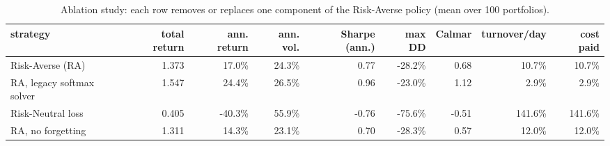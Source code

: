 \begin{table}[ht!]
\centering
\footnotesize
\setlength{\tabcolsep}{4pt}
\begin{tabular}{lrrrrrrrr}
\hline
strategy & total return & ann. return & ann. vol. & Sharpe (ann.) & max DD & Calmar & turnover/day & cost paid \\
\hline
Risk-Averse (RA) & 1.373 & 17.0\% & 24.3\% & 0.77 & -28.2\% & 0.68 & 10.7\% & 10.7\% \\
RA, legacy softmax solver & 1.547 & 24.4\% & 26.5\% & 0.96 & -23.0\% & 1.12 & 2.9\% & 2.9\% \\
Risk-Neutral loss & 0.405 & -40.3\% & 55.9\% & -0.76 & -75.6\% & -0.51 & 141.6\% & 141.6\% \\
RA, no forgetting & 1.311 & 14.3\% & 23.1\% & 0.70 & -28.3\% & 0.57 & 12.0\% & 12.0\% \\
\hline
\end{tabular}
\caption{Ablation study: each row removes or replaces one component of the Risk-Averse policy (mean over 100 portfolios).}
\label{tab:ablation_bear2022}
\end{table}
